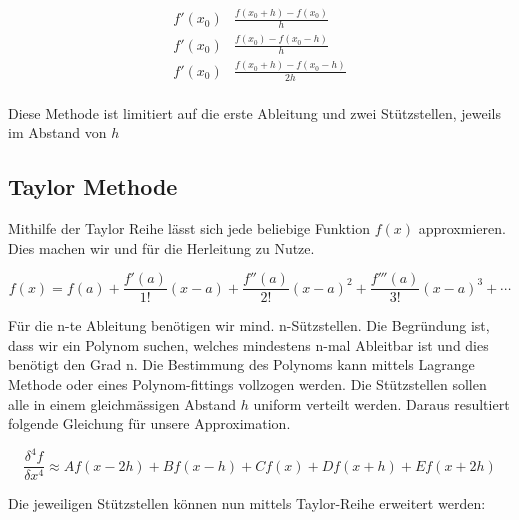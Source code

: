 \begin{equation}
	\begin{split}
f'(x_0) & \frac{f(x_0 + h) - f(x_0)}{h} \\
f'(x_0) & \frac{f(x_0) - f(x_0 - h)}{h} \\
f'(x_0) & \frac{f(x_0 + h) - f(x_0 - h)}{2h} \\
	\end{split}
\label{ableitung:equations:differenzenquotient}
\end{equation}



Diese Methode ist limitiert auf die erste Ableitung und zwei Stützstellen, jeweils im Abstand von $h$

\subsection{Taylor Methode}

Mithilfe der Taylor Reihe lässt sich jede beliebige Funktion $f(x)$ approxmieren. Dies machen wir und für die Herleitung zu Nutze.

\begin{equation}
	f(x) = f(a)+{\frac {f'(a)}{1!}}(x-a)+{\frac {f''(a)}{2!}}(x-a)^{2}+{\frac {f'''(a)}{3!}}(x-a)^{3}+\cdots
	\label{ableitung:eqn:taylorseries}
\end{equation}

Für die n-te Ableitung benötigen wir mind. n-Sützstellen.
Die Begründung ist, dass wir ein Polynom suchen, welches mindestens n-mal Ableitbar ist und dies benötigt den Grad n. Die Bestimmung des Polynoms kann mittels Lagrange Methode oder eines Polynom-fittings vollzogen werden.
Die Stützstellen sollen alle in einem gleichmässigen Abstand $h$ uniform verteilt werden.
Daraus resultiert folgende Gleichung für unsere Approximation.

\begin{equation}
	\frac{\delta^{4} f}{\delta x^4} \approx Af(x-2h) + Bf(x-h) + Cf(x) + Df(x+h) + Ef(x+2h)
\end{equation}

Die jeweiligen Stützstellen können nun mittels Taylor-Reihe erweitert werden:

